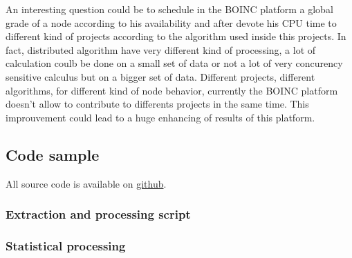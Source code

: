 An interesting question could be to schedule in the BOINC platform a global grade of a node according 
to his availability and after devote his CPU time to different kind of projects according to the algorithm
used inside this projects. In fact, distributed algorithm have very different kind of processing, a lot of calculation
coulb be done on a small set of data or not a lot of very concurency sensitive calculus but on a bigger set of data.
 Different projects, different algorithms, for different kind of node behavior, currently the BOINC platform doesn't allow 
to contribute to differents projects in the same time. This improuvement could lead to a huge enhancing of results of this platform.

\subsection{Code sample}

All source code is available on 
\href{https://github.com/sieben/upmc/tree/master/methodologie/homework2-gnuplot}{github}.

\subsubsection{Extraction and processing script}



\subsubsection{Statistical processing}



